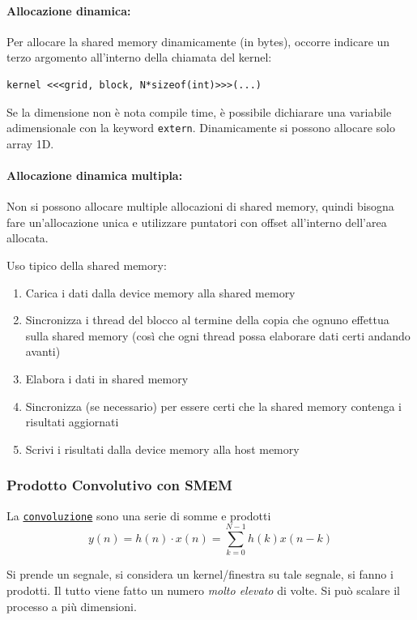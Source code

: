 \paragraph{Allocazione dinamica:} Per allocare la shared memory dinamicamente (in bytes), occorre indicare un terzo argomento all'interno della chiamata del kernel:
\begin{verbatim}
kernel <<<grid, block, N*sizeof(int)>>>(...)
\end{verbatim}

Se la dimensione non è nota compile time, è possibile dichiarare una variabile adimensionale con la keyword \texttt{extern}. Dinamicamente si possono allocare solo array 1D.

\paragraph{Allocazione dinamica multipla:} Non si possono allocare multiple allocazioni di shared memory, quindi bisogna fare un'allocazione unica e utilizzare puntatori con offset all'interno dell'area allocata.

Uso tipico della shared memory:
\begin{enumerate}
	\item Carica i dati dalla device memory alla shared memory
	
	\item Sincronizza i thread del blocco al termine della copia che ognuno effettua sulla shared memory (così che ogni thread possa elaborare dati certi andando avanti)
	
	\item Elabora i dati in shared memory

	\item Sincronizza (se necessario) per essere certi che la shared memory contenga i risultati aggiornati
	
	\item Scrivi i risultati dalla device memory alla host memory
\end{enumerate}

\subsubsection{Prodotto Convolutivo con SMEM}
La \href{https://it.wikipedia.org/wiki/Convoluzione}{\texttt{convoluzione}} sono una serie di somme e prodotti
$$ y(n) = h(n) \cdot x(n) = \sum_{k=0}^{N-1} h(k) x(n-k) $$

Si prende un segnale, si considera un kernel/finestra su tale segnale, si fanno i prodotti. Il tutto viene fatto un numero \textit{molto elevato} di volte. Si può scalare il processo a più dimensioni.

